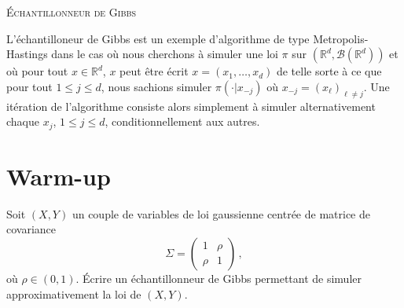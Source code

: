 \documentclass[a4paper,10pt,fleqn]{article}
\newcommand{\rset}{\ensuremath{\mathbb{R}}}
\newcommand{\1}{\ensuremath{\mathbbm{1}}}
\begin{document}

\noindent\hrulefill

\begin{center}
\textsc{\'Echantillonneur de Gibbs}
\end{center}
\hrulefill

\medskip


L'\'echantilloneur de Gibbs est un exemple d'algorithme de type Metropolis-Hastings dans le cas o\`u nous cherchons \`a simuler une loi  $\pi$ sur $(\rset^d,\mathcal{B}(\rset^d))$ et o\`u pour tout $x\in\rset^d$, $x$ peut \^etre \'ecrit $x = (x_{1},\ldots,x_{d})$ de telle sorte \`a ce que pour tout  $1\leq j \leq d$,  nous sachions simuler $\pi(\cdot |x_{-j})$ o\`u $x_{{-j}} = (x_{\ell})_{\ell \neq j}$. Une it\'eration de l'algorithme consiste alors simplement \`a simuler alternativement chaque $x_{j}$, $1\leq j \leq d$, conditionnellement aux autres.

\section*{Warm-up}
Soit $(X,Y)$ un couple de variables de loi gaussienne centr\'ee de matrice de covariance 
$$
\Sigma = \begin{pmatrix}
1 & \rho\\ \rho & 1
\end{pmatrix}\,,
$$
o\`u $\rho \in(0,1)$. 
\'Ecrire un \'echantillonneur de Gibbs permettant de simuler approximativement la loi de $(X,Y)$.

%
\end{document}
